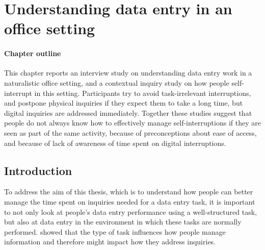 \chapter{Understanding data entry in an office setting}\label{ch:12}
\begin{mynote}
\subsubsection{Chapter outline}

This chapter reports an interview study on understanding data entry work in a naturalistic office setting, and a contextual inquiry study on how people self-interrupt in this setting. Participants try to avoid task-irrelevant interruptions, and postpone physical inquiries if they expect them to take a long time, but digital inquiries are addressed immediately. Together these studies suggest that people do not always know how to effectively manage self-interruptions if they are seen as part of the same activity, because of preconceptions about ease of access, and because of lack of awareness of time spent on digital interruptions.

\end{mynote}

\section{Introduction}
To address the aim of this thesis, which is to understand how people can better manage the time spent on inquiries needed for a data entry task, it is important to not only look at people's data entry performance using a well-structured task, but also at data entry in the environment in which these tasks are normally performed. \citet{Bondarenko2005} showed that the type of task influences how people manage information and therefore might impact how they address inquiries.

